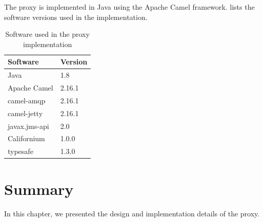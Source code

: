 The proxy is implemented in Java using the Apache Camel framework.
 lists the software versions used in the
implementation.

\begin{table}[h]
\begin{tabularx}{0.5\textwidth}{|X|X|}
\hline
\textbf{Software} & \textbf{Version} \\ \hline
Java            & 1.8           \\ \hline
Apache Camel     & 2.16.1           \\ \hline
camel-amqp      & 2.16.1            \\ \hline
camel-jetty      & 2.16.1            \\ \hline
javax.jms-api      & 2.0            \\ \hline
Californium      & 1.0.0            \\ \hline
typesafe      & 1.3.0            \\ \hline
\end{tabularx}
\caption{Software used in the proxy implementation}
\label{table:implementation-versions}
\end{table}

\section{Summary}

In this chapter, we presented the design and implementation details of the proxy.
